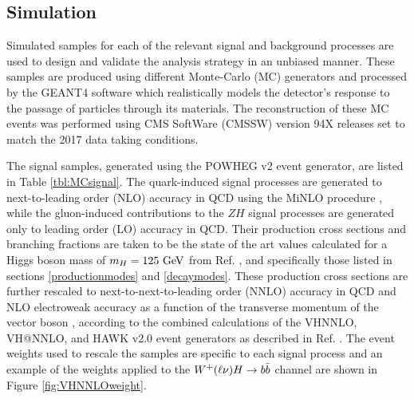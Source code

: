 \subsection{Simulation}

Simulated samples for each of the relevant signal and background processes are used to design and validate the analysis strategy in an unbiased manner. These samples are produced using different Monte-Carlo (MC) generators and processed by the \textsc{\small GEANT4}\cite{GEANT4A,GEANT4B,GEANT4C} software which realistically models the detector's response to the passage of particles through its materials. The reconstruction of these MC events was performed using CMS SoftWare (CMSSW) version 94X releases set to match the 2017 data taking conditions.

The signal samples, generated using the \textsc{\small POWHEG} v2\cite{POWHEGA,POWHEGB,POWHEGC} event generator, are listed in Table \ref{tbl:MCsignal}. The quark-induced signal processes are generated to next-to-leading order (NLO) accuracy in QCD using the MiNLO procedure \cite{MINLOA,MINLOB}, while the gluon-induced contributions to the $ZH$ signal processes are generated only to leading order (LO) accuracy in QCD. Their production cross sections and branching fractions are taken to be the state of the art values calculated for a Higgs boson mass of $m_{H} = 125\ \mathrm{GeV}$ from Ref. \cite{CERNYR4}, and specifically those listed in sections \ref{productionmodes} and \ref{decaymodes}. These production cross sections are further rescaled to next-to-next-to-leading order (NNLO) accuracy in QCD and NLO electroweak accuracy as a function of the transverse momentum of the vector boson \pTV, according to the combined calculations of the \textsc{\small VHNNLO}\cite{VHNNLOA,VHNNLOB,VHNNLOC,VHNNLOD}, \textsc{\small VH@NNLO}\cite{VHATNNLOA,VHATNNLOB}, and \textsc{\small HAWK} v2.0\cite{HAWK} event generators as described in Ref. \cite{CERNYR4}. The event weights used to rescale the samples are specific to each signal process and an example of the weights applied to the $W^{+}(\ell\nu)H\rightarrow b\bar{b}$ channel are shown in Figure \ref{fig:VHNNLOweight}.

